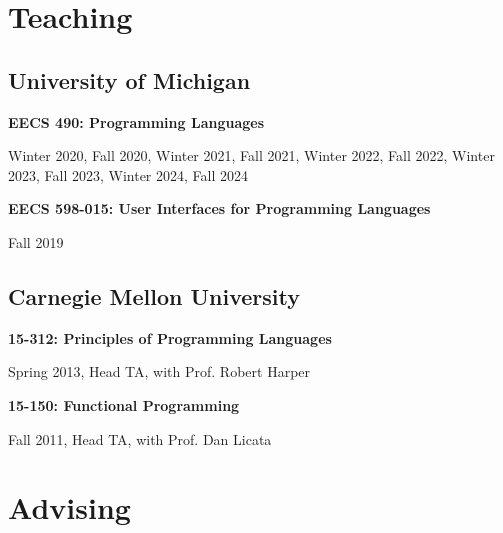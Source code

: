 \documentclass[10pt,letterpaper]{article}
\renewenvironment{itemize}{
  \begin{list}{}{
    \setlength{\leftmargin}{1.25em}
    \setlength{\itemsep}{0.25em}
    \setlength{\parskip}{0pt}
    \setlength{\parsep}{0.2em}
  }
}{
  \end{list}
}
\begin{document}
\section*{Teaching}
\subsection*{University of Michigan}
\begin{itemize}
  \item \textbf{EECS 490: Programming Languages}
        \begin{itemize}
          \item Winter 2020, Fall 2020, Winter 2021, Fall 2021, Winter 2022, Fall 2022, Winter 2023, Fall 2023, Winter 2024, Fall 2024
        \end{itemize}
  \item \textbf{EECS 598-015: User Interfaces for Programming Languages}
        \begin{itemize}
          \item Fall 2019
        \end{itemize}
\end{itemize}

\subsection*{Carnegie Mellon University}
\begin{itemize}
  \item \textbf{15-312: Principles of Programming Languages}
        \begin{itemize}
          \item Spring 2013, Head TA, with Prof. Robert Harper
        \end{itemize}
  \item \textbf{15-150: Functional Programming}
        \begin{itemize}
          \item Fall 2011, Head TA, with Prof. Dan Licata
        \end{itemize}
\end{itemize}


\section*{Advising}
\end{document}

